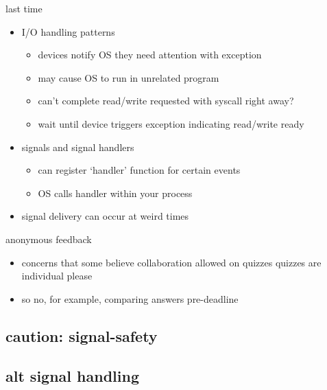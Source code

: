 \date{}
\title{}
\date{}

\begin{frame}
    \titlepage
\end{frame}



\begin{frame}{last time}
    \begin{itemize}
    \item I/O handling patterns
        \begin{itemize}
        \item devices notify OS they need attention with exception
        \item may cause OS to run in unrelated program
        \item can't complete read/write requested with syscall right away?
        \item wait until device triggers exception indicating read/write ready
        \end{itemize}
    \item signals and signal handlers
        \begin{itemize}
        \item can register `handler' function for certain events
        \item OS calls handler within your process
        \end{itemize}
    \item signal delivery can occur at weird times
    \end{itemize}
\end{frame}

\begin{frame}{anonymous feedback}
    \begin{itemize}
    \item concerns that some believe collaboration allowed on quizzes
    \vspace{.5cm}
    \tiem quizzes are individual please
    \item so no, for example, comparing answers pre-deadline
    \end{itemize}
\end{frame}

\subsection{caution: signal-safety}


\subsection{alt signal handling}


